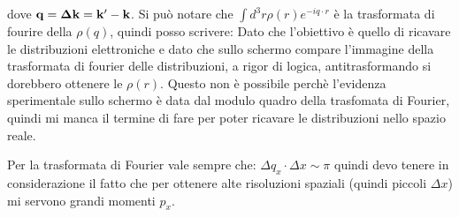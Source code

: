 \documentclass[a4paper,12pt]{article}
\begin{document}
dove $\it\bf{q} = \Delta \it\bf{k} = \it\bf{k'} - \it\bf{k}$. Si può notare che $\int d^3r \rho(r) e^{-i q\cdot r}$ è la trasformata di fourire della $\rho(q)$, quindi posso scrivere:
Dato che l'obiettivo è quello di ricavare le distribuzioni elettroniche e dato che sullo schermo compare l'immagine della trasformata di fourier delle distribuzioni, a rigor di logica, antitrasformando si dorebbero ottenere le $\rho(r)$. Questo non è possibile perchè l'evidenza sperimentale sullo schermo è data dal modulo quadro della trasfomata di Fourier, quindi mi manca il termine di fare per poter ricavare le distribuzioni nello spazio reale.

Per la trasformata di Fourier vale sempre che: $\Delta q_x \cdot \Delta x \sim \pi$ quindi devo tenere in considerazione il fatto che per ottenere alte risoluzioni spaziali (quindi piccoli $\Delta x$) mi servono grandi momenti $p_x$.
\end{document}
